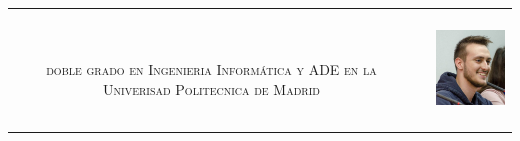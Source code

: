 \documentclass[10pt,A4]{article}
\newcommand{\mystrut}{\rule[-.3\baselineskip]{0pt}{\baselineskip}}
\begin{document}
\pagestyle{fancy}	


\mystrut
\vspace{-12pt}

\begin{tabular*}{1\textwidth}{ c c c}
	\parbox[c]{0.4\linewidth}{
		\colorbox{thirdcol}{}\\
		\Large{\textcolor{thirdcol}{\textsc{doble grado en Ingenieria Informática y ADE en la Univerisad Politecnica de Madrid}}}\\
	}&
	\parbox{0.25\textwidth}{
		\Large{\textcolor{thirdcol}{\textsc{}}}\\
	}&
	\parbox{0.20\textwidth}{
		\includegraphics[width=\linewidth,height=3cm]{myfoto.jpg}	%
	}
\end{tabular*}
\small
\vspace{16pt}
\end{document}
